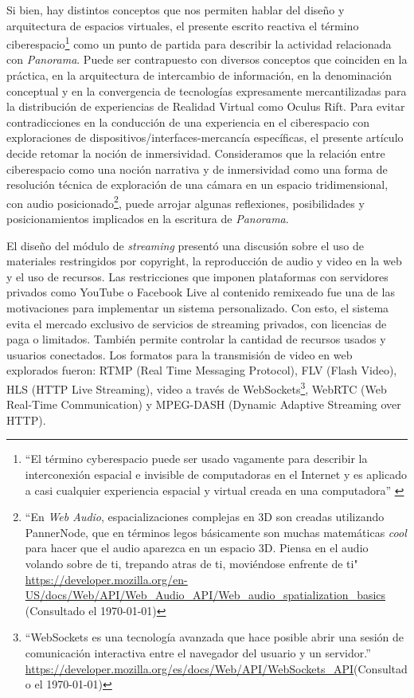 Si bien, hay distintos conceptos que nos permiten hablar del diseño y arquitectura de espacios virtuales, el presente escrito reactiva el término ciberespacio\footnote{``El término cyberespacio puede ser usado vagamente para describir la interconexión espacial e invisible de computadoras en el Internet y es aplicado a casi cualquier experiencia espacial y virtual creada en una computadora'' \citep{cyberspace}} como un punto de partida para describir la actividad relacionada con \textit{Panorama}. Puede ser contrapuesto con diversos conceptos que coinciden en la práctica, en la arquitectura de intercambio de información, en la denominación conceptual y en la convergencia de tecnologías expresamente mercantilizadas para la distribución de experiencias de Realidad Virtual como Oculus Rift. Para evitar contradicciones en la conducción de una experiencia en el ciberespacio con exploraciones de dispositivos/interfaces-mercancía específicas, el presente artículo decide retomar la noción de inmersividad. Consideramos que la relación entre ciberespacio como una noción narrativa y de inmersividad como una forma de resolución técnica de exploración de una cámara en un espacio tridimensional, con audio posicionado\footnote{``En \textit{Web Audio}, espacializaciones complejas en 3D son creadas utilizando PannerNode, que en términos legos básicamente son muchas matemáticas \textit{cool} para hacer que el audio aparezca en un espacio 3D. Piensa en el audio volando sobre de ti, trepando atras de ti, moviéndose enfrente de ti" \url{https://developer.mozilla.org/en-US/docs/Web/API/Web_Audio_API/Web_audio_spatialization_basics} (Consultado el \today)}, puede arrojar algunas reflexiones, posibilidades y posicionamientos implicados en la escritura de \textit{Panorama}. %
\color{black}

El diseño del módulo de \textit{streaming} presentó una discusión sobre el uso de materiales restringidos por copyright, la reproducción de audio y video en la web y el uso de recursos. Las restricciones que imponen plataformas con servidores privados como YouTube o Facebook Live al contenido remixeado fue una de las motivaciones para implementar un sistema personalizado. Con esto, el sistema evita el mercado exclusivo de servicios de streaming privados, con licencias de paga o limitados. También permite controlar la cantidad de recursos usados y usuarios conectados. Los formatos para la transmisión de video en web explorados fueron: RTMP (Real Time Messaging Protocol), FLV (Flash Video), HLS (HTTP Live Streaming), video a través de WebSockets\footnote{``WebSockets es una tecnología avanzada que hace posible abrir una sesión de comunicación interactiva entre el navegador del usuario y un servidor.'' \url{https://developer.mozilla.org/es/docs/Web/API/WebSockets_API}(Consultado el \today)}, WebRTC (Web Real-Time Communication) y MPEG-DASH (Dynamic Adaptive Streaming over HTTP). %

